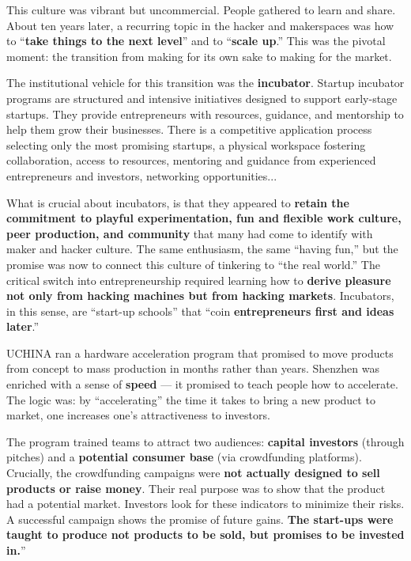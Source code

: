 \documentclass[11pt,a4paper]{article}
\begin{document}
This culture was vibrant but uncommercial. People gathered to learn and share. About ten years later, a recurring topic in the hacker and makerspaces was how to ``\textbf{take things to the next level}'' and to ``\textbf{scale up}.'' This was the pivotal moment: the transition from making for its own sake to making for the market.

The institutional vehicle for this transition was the \textbf{incubator}. Startup incubator programs are structured and intensive initiatives designed to support early-stage startups. They provide entrepreneurs with resources, guidance, and mentorship to help them grow their businesses. There is a competitive application process selecting only the most promising startups, a physical workspace fostering collaboration, access to resources, mentoring and guidance from experienced entrepreneurs and investors, networking opportunities...

What is crucial about incubators, is that they appeared to \textbf{retain the commitment to playful experimentation, fun and flexible work culture, peer production, and community} that many had come to identify with maker and hacker culture. The same enthusiasm, the same ``having fun,'' but the promise was now to connect this culture of tinkering to ``the real world.'' The critical switch into entrepreneurship required learning how to \textbf{derive pleasure not only from hacking machines but from hacking markets}. Incubators, in this sense, are ``start-up schools'' that ``coin \textbf{entrepreneurs first and ideas later}.''

UCHINA ran a hardware acceleration program that promised to move products from concept to mass production in months rather than years. Shenzhen was enriched with a sense of \textbf{speed} --- it promised to teach people how to accelerate. The logic was: by ``accelerating'' the time it takes to bring a new product to market, one increases one's attractiveness to investors.

The program trained teams to attract two audiences: \textbf{capital investors} (through pitches) and a \textbf{potential consumer base} (via crowdfunding platforms). Crucially, the crowdfunding campaigns were \textbf{not actually designed to sell products or raise money}. Their real purpose was to show that the product had a potential market. Investors look for these indicators to minimize their risks. A successful campaign shows the promise of future gains. \textbf{The start-ups were taught to produce not products to be sold, but promises to be invested in.}''
\end{document}
